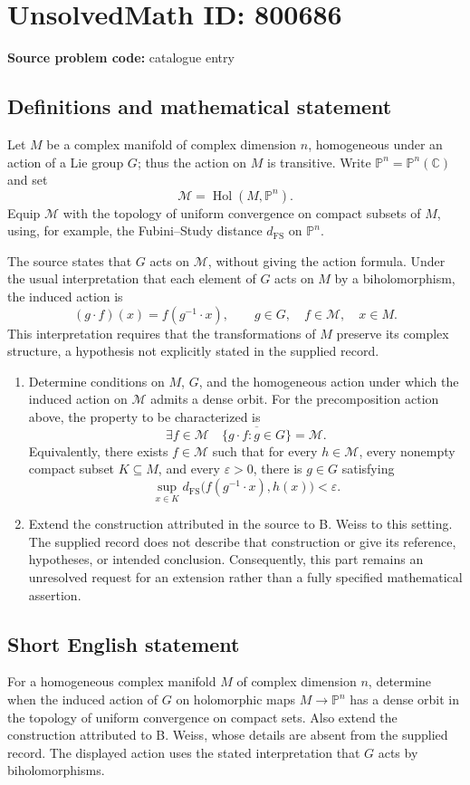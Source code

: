 \documentclass[11pt]{article}
\newcommand{\C}{\mathbb{C}}
\newcommand{\PP}{\mathbb{P}}
\begin{document}
\section*{UnsolvedMath ID: 800686}
\textbf{Source problem code:} catalogue entry
\subsection{Definitions and mathematical statement}
Let \(M\) be a complex manifold of complex dimension \(n\), homogeneous under an action of a Lie group \(G\); thus the action on \(M\) is transitive. Write \(\PP^n=\PP^n(\C)\) and set
\[
\mathscr M=\operatorname{Hol}(M,\PP^n).
\]
Equip \(\mathscr M\) with the topology of uniform convergence on compact subsets of \(M\), using, for example, the Fubini--Study distance \(d_{\mathrm{FS}}\) on \(\PP^n\).

The source states that \(G\) acts on \(\mathscr M\), without giving the action formula. Under the usual interpretation that each element of \(G\) acts on \(M\) by a biholomorphism, the induced action is
\[
(g\cdot f)(x)=f(g^{-1}\cdot x),
\qquad g\in G,\quad f\in\mathscr M,\quad x\in M.
\]
This interpretation requires that the transformations of \(M\) preserve its complex structure, a hypothesis not explicitly stated in the supplied record.

\begin{enumerate}
\item[(i)] Determine conditions on \(M\), \(G\), and the homogeneous action under which the induced action on \(\mathscr M\) admits a dense orbit. For the precomposition action above, the property to be characterized is
\[
\exists f\in\mathscr M\quad
\overline{\{g\cdot f:g\in G\}}=\mathscr M.
\]
Equivalently, there exists \(f\in\mathscr M\) such that for every \(h\in\mathscr M\), every nonempty compact subset \(K\subseteq M\), and every \(\varepsilon>0\), there is \(g\in G\) satisfying
\[
\sup_{x\in K}d_{\mathrm{FS}}\bigl(f(g^{-1}\cdot x),h(x)\bigr)<\varepsilon.
\]
\item[(ii)] Extend the construction attributed in the source to B. Weiss to this setting. The supplied record does not describe that construction or give its reference, hypotheses, or intended conclusion. Consequently, this part remains an unresolved request for an extension rather than a fully specified mathematical assertion.
\end{enumerate}
\subsection{Short English statement}
For a homogeneous complex manifold \(M\) of complex dimension \(n\), determine when the induced action of \(G\) on holomorphic maps \(M\to\PP^n\) has a dense orbit in the topology of uniform convergence on compact sets. Also extend the construction attributed to B. Weiss, whose details are absent from the supplied record. The displayed action uses the stated interpretation that \(G\) acts by biholomorphisms.
\end{document}
